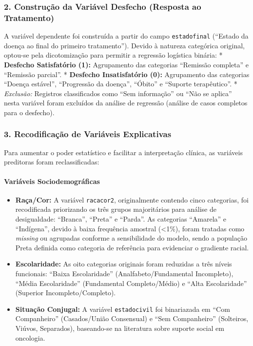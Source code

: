 \documentclass[
]{article}
\providecommand{\tightlist}{%
  \setlength{\itemsep}{0pt}\setlength{\parskip}{0pt}}
\begin{document}
\subsubsection{2. Construção da Variável Desfecho (Resposta ao
Tratamento)}\label{construuxe7uxe3o-da-variuxe1vel-desfecho-resposta-ao-tratamento}

A variável dependente foi construída a partir do campo
\texttt{estadofinal} (``Estado da doença ao final do primeiro
tratamento''). Devido à natureza categórica original, optou-se pela
dicotomização para permitir a regressão logística binária: *
\textbf{Desfecho Satisfatório (1):} Agrupamento das categorias
``Remissão completa'' e ``Remissão parcial''. * \textbf{Desfecho
Insatisfatório (0):} Agrupamento das categorias ``Doença estável'',
``Progressão da doença'', ``Óbito'' e ``Suporte terapêutico''. *
\emph{Exclusão:} Registros classificados como ``Sem informação'' ou
``Não se aplica'' nesta variável foram excluídos da análise de regressão
(análise de casos completos para o desfecho).

\subsubsection{3. Recodificação de Variáveis
Explicativas}\label{recodificauxe7uxe3o-de-variuxe1veis-explicativas}

Para aumentar o poder estatístico e facilitar a interpretação clínica,
as variáveis preditoras foram reclassificadas:

\paragraph{Variáveis
Sociodemográficas}\label{variuxe1veis-sociodemogruxe1ficas}

\begin{itemize}
\tightlist
\item
  \textbf{Raça/Cor:} A variável \texttt{racacor2}, originalmente
  contendo cinco categorias, foi recodificada priorizando os três grupos
  majoritários para análise de desigualdade: ``Branca'', ``Preta'' e
  ``Parda''. As categorias ``Amarela'' e ``Indígena'', devido à baixa
  frequência amostral (\textless1\%), foram tratadas como \emph{missing}
  ou agrupadas conforme a sensibilidade do modelo, sendo a população
  Preta definida como categoria de referência para evidenciar o
  gradiente racial.
\item
  \textbf{Escolaridade:} As oito categorias originais foram reduzidas a
  três níveis funcionais: ``Baixa Escolaridade'' (Analfabeto/Fundamental
  Incompleto), ``Média Escolaridade'' (Fundamental Completo/Médio) e
  ``Alta Escolaridade'' (Superior Incompleto/Completo).
\item
  \textbf{Situação Conjugal:} A variável \texttt{estadocivil} foi
  binariazada em ``Com Companheiro'' (Casados/União Consensual) e ``Sem
  Companheiro'' (Solteiros, Viúvos, Separados), baseando-se na
  literatura sobre suporte social em oncologia.
\end{itemize}
\end{document}
